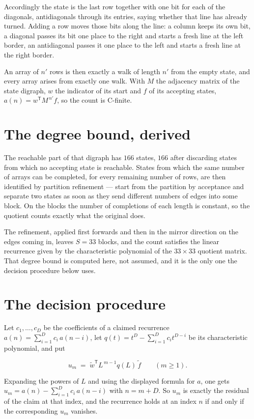 \documentclass[11pt]{article}
\theoremstyle{definition}
\begin{document}
Accordingly the state is the last row together with one bit for each of the diagonals, antidiagonals through its entries, saying whether that line has already turned. Adding a row moves those bits along the line: a column keeps its own bit, a diagonal passes its bit one place to the right and starts a fresh line at the left border, an antidiagonal passes it one place to the left and starts a fresh line at the right border.

An array of $n'$ rows is then exactly a walk of length $n'$ from the empty state, and every array arises from exactly one walk. With $M$ the adjacency matrix of the state digraph, $w$ the indicator of its start and $f$ of its accepting states, $a(n) = w^{\mathsf T}M^{\,n'}f$, so the count is C-finite.

\section{The degree bound, derived}

The reachable part of that digraph has $166$ states, $166$ after discarding states from which no accepting state is reachable. States from which the same number of arrays can be completed, for every remaining number of rows, are then identified by partition refinement --- start from the partition by acceptance and separate two states as soon as they send different numbers of edges into some block. On the blocks the number of completions of each length is constant, so the quotient counts exactly what the original does.

The refinement, applied first forwards and then in the mirror direction on the edges coming in, leaves $S = 33$ blocks, and the count satisfies the linear recurrence given by the characteristic polynomial of the $33 \times 33$ quotient matrix. That degree bound is computed here, not assumed, and it is the only one the decision procedure below uses.

\section{The decision procedure}

Let $c_1,\dots,c_D$ be the coefficients of a claimed recurrence $a(n) = \sum_{i=1}^{D} c_i\,a(n-i)$, let $q(t) = t^{D} - \sum_{i=1}^{D} c_i t^{D-i}$ be its characteristic polynomial, and put

\[u_m \;=\; \tilde w^{\mathsf T} L^{\,m-1} q(L)\,\tilde f \qquad (m \ge 1).\]

Expanding the powers of $L$ and using the displayed formula for $a$, one gets $u_m = a(n) - \sum_{i=1}^{D} c_i\,a(n-i)$ with $n = m + D$. So $u_m$ is exactly the residual of the claim at that index, and the recurrence holds at an index $n$ if and only if the corresponding $u_m$ vanishes.
\end{document}
